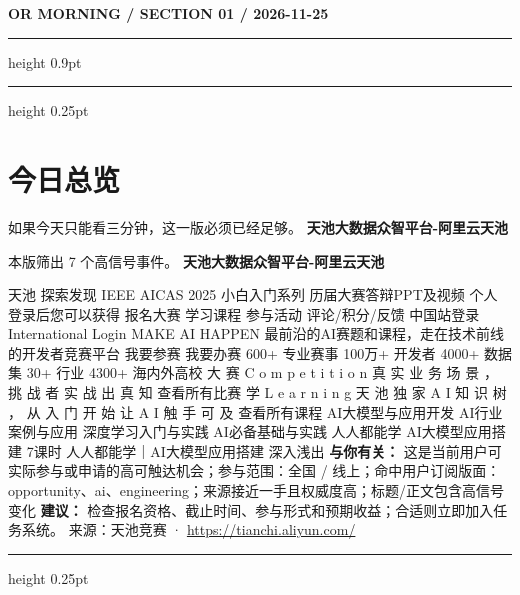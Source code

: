 \documentclass[10.5pt]{ctexart}
\begin{document}
{\small\bfseries OR MORNING / SECTION 01 / 2026-11-25}
\vspace{2mm}
\hrule height 0.9pt
\vspace{1.5mm}
\hrule height 0.25pt
\vspace{4mm}
\section*{今日总览}
{\color{ormuted} 如果今天只能看三分钟，这一版必须已经足够。}
\vspace{2mm}
{\fontsize{25}{29}\selectfont\bfseries 天池大数据众智平台-阿里云天池}\par
\vspace{2mm}
{\large 本版筛出 7 个高信号事件。}
\vspace{3mm}
{\Large\bfseries 天池大数据众智平台-阿里云天池}\par
天池 探索发现 IEEE AICAS 2025 小白入门系列 历届大赛答辩PPT及视频 个人 登录后您可以获得 报名大赛 学习课程 参与活动 评论/积分/反馈 中国站登录 International Login MAKE AI HAPPEN 最前沿的AI赛题和课程，走在技术前线的开发者竞赛平台 我要参赛 我要办赛 600+ 专业赛事 100万+ 开发者 4000+ 数据集 30+ 行业 4300+ 海内外高校 大 赛 C o m p e t i t i o n 真 实 业 务 场 景 ， 挑 战 者 实 战 出 真 知 查看所有比赛 学 L e a r n i n g 天 池 独 家 A I 知 识 树 ， 从 入 门 开 始 让 A I 触 手 可 及 查看所有课程 AI大模型与应用开发 AI行业案例与应用 深度学习入门与实践 AI必备基础与实践 人人都能学 AI大模型应用搭建 7课时 人人都能学｜AI大模型应用搭建 深入浅出
\textbf{与你有关：} 这是当前用户可实际参与或申请的高可触达机会；参与范围：全国 / 线上；命中用户订阅版面：opportunity、ai、engineering；来源接近一手且权威度高；标题/正文包含高信号变化
\textbf{建议：} 检查报名资格、截止时间、参与形式和预期收益；合适则立即加入任务系统。
{\footnotesize\color{ormuted} 来源：天池竞赛 · \url{https://tianchi.aliyun.com/}}
\vspace{3mm}
\hrule height 0.25pt
\vspace{3mm}
\end{document}
